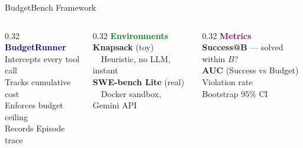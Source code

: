 \documentclass[aspectratio=169, 12pt]{beamer}
\begin{document}
\begin{frame}{BudgetBench Framework}

\begin{center}
\end{center}

\vspace{0.2cm}
\begin{columns}[T]
  \begin{column}{0.32\textwidth}
    {\small\textcolor{navy}{\textbf{BudgetRunner}}}\\[0.1cm]
    {\footnotesize
      Intercepts every tool call\\
      Tracks cumulative cost\\
      Enforces budget ceiling\\
      Records Episode trace
    }
  \end{column}
  \begin{column}{0.32\textwidth}
    {\small\textcolor{green}{\textbf{Environments}}}\\[0.1cm]
    {\footnotesize
      \textbf{Knapsack} (toy)\\
      ~~Heuristic, no LLM, instant\\[0.15cm]
      \textbf{SWE-bench Lite} (real)\\
      ~~Docker sandbox, Gemini API
    }
  \end{column}
  \begin{column}{0.32\textwidth}
    {\small\textcolor{purple}{\textbf{Metrics}}}\\[0.1cm]
    {\footnotesize
      \textbf{Success@B} — solved within $B$?\\
      \textbf{AUC} (Success vs Budget)\\
      Violation rate\\
      Bootstrap 95\% CI
    }
  \end{column}
\end{columns}

\end{frame}
\end{document}
